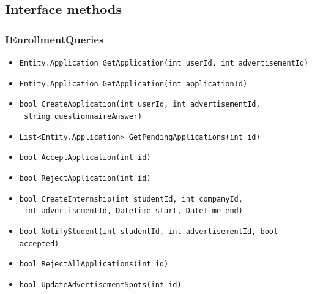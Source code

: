 \subsection{Interface methods}

\subsubsection{IEnrollmentQueries}
\begin{itemize}
    \item \verb|Entity.Application GetApplication(int userId, int advertisementId)|
    \item \verb|Entity.Application GetApplication(int applicationId)|
    \item \verb|bool CreateApplication(int userId, int advertisementId,| \\ \makebox[10em][l]{} \verb| string questionnaireAnswer)|
    \item \verb|List<Entity.Application> GetPendingApplications(int id)|
    \item \verb|bool AcceptApplication(int id)|
    \item \verb|bool RejectApplication(int id)|
    \item \verb|bool CreateInternship(int studentId, int companyId,| \\ \makebox[10em][l]{} \verb| int advertisementId, DateTime start, DateTime end)|
    \item \verb|bool NotifyStudent(int studentId, int advertisementId, bool accepted)|
    \item \verb|bool RejectAllApplications(int id)|
    \item \verb|bool UpdateAdvertisementSpots(int id)|
\end{itemize}

